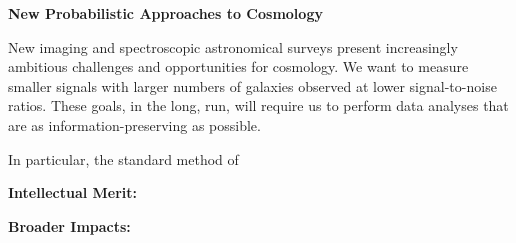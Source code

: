 \documentclass[12pt]{article}
\begin{document}
\sloppy\sloppypar\thispagestyle{empty}

\noindent
\textbf{New Probabilistic Approaches to Cosmology}
\smallskip

New imaging and spectroscopic astronomical surveys present
increasingly ambitious challenges and opportunities for cosmology.
We want to measure smaller signals with larger numbers of galaxies
observed at lower signal-to-noise ratios.
These goals, in the long, run, will require us to perform data
analyses that are as information-preserving as possible.

In particular, the standard method of

\noindent
\textbf{Intellectual Merit:}

\noindent
\textbf{Broader Impacts:}
\end{document}
